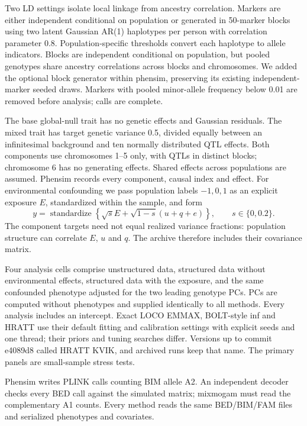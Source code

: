 \documentclass[11pt]{article}
\begin{document}
Two LD settings isolate local linkage from ancestry correlation.
Markers are either independent conditional on population or generated
in 50-marker blocks using two latent Gaussian AR(1) haplotypes per person
with correlation parameter 0.8. Population-specific thresholds convert
each haplotype to allele indicators. Blocks are independent conditional
on population, but pooled genotypes share ancestry correlations across
blocks and chromosomes. We added the optional block generator within
phensim, preserving its existing independent-marker seeded draws.
Markers with pooled minor-allele frequency below 0.01 are removed
before analysis; calls are complete.

The base global-null trait has no genetic effects and Gaussian residuals.
The mixed trait has target genetic variance 0.5, divided equally between
an infinitesimal background and ten normally distributed QTL effects.
Both components use chromosomes 1--5 only, with QTLs in distinct blocks;
chromosome 6 has no generating effects. Shared effects across populations
are assumed. Phensim records every component, causal index and effect.
For environmental confounding we pass population labels $-1,0,1$ as an
explicit exposure $E$, standardized within the sample, and form
\begin{equation}
 y=\operatorname{standardize}\left\{\sqrt{s}E+
       \sqrt{1-s}(u+q+e)\right\},\qquad s\in\{0,0.2\}.
 \label{eq:phensim-environment}
\end{equation}
The component targets need not equal realized variance
fractions: population structure can correlate $E$, $u$ and $q$.
The archive therefore includes their covariance matrix.

Four analysis cells comprise unstructured data, structured data without
environmental effects, structured data with the exposure, and the same
confounded phenotype adjusted for the two leading genotype PCs. PCs are
computed without phenotypes and supplied identically to all methods.
Every analysis includes an intercept. Exact LOCO EMMAX, BOLT-style inf and
HRATT use their default fitting and calibration settings with explicit
seeds and one thread; their priors and tuning searches differ. Versions
up to commit e4089d8 called HRATT KVIK, and archived runs keep that name.
The primary panels are small-sample stress tests.

Phensim writes PLINK calls counting BIM allele A2. An independent decoder
checks every BED call against the simulated matrix; mixmogam must read
the complementary A1 counts. Every method reads the same BED/BIM/FAM files
and serialized phenotypes and covariates.
\end{document}
